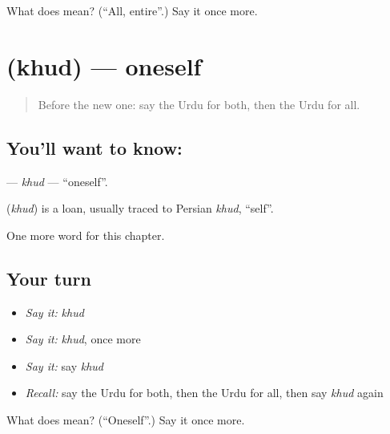 \begin{tcolorbox}[breakable,colback=teal!4,colframe=teal!35!black,title={Before you move on}]
What does  mean? (\textquotedblleft{}All, entire\textquotedblright{}.) Say it once more.
\end{tcolorbox}
\section[\texorpdfstring{\ur{خود} (khud)}{خود (khud)}]{ (khud) — oneself}

\label{lesson:UR-C90-khud}



\begin{quote}
Before the new one: say the Urdu for both, then the Urdu for all.
\end{quote}

\subsection*{You'll want to know: }
\textbf{} — \emph{khud} — \textquotedblleft{}oneself\textquotedblright{}.

\begin{cousinweb}
\textbf{} (\emph{khud}) is a loan, usually traced to Persian \emph{khud}, \textquotedblleft{}self\textquotedblright{}.
\end{cousinweb}

\begin{grammarlens}[title={What you've built}]
One more word for this chapter.
\end{grammarlens}

\subsection*{Your turn}
\begin{itemize}
\raggedright
  \item \emph{Say it:} \emph{khud}
  \item \emph{Say it:} \emph{khud}, once more
  \item \emph{Say it:} say \emph{khud}
  \item \emph{Recall:} say the Urdu for both, then the Urdu for all, then say \emph{khud} again
\end{itemize}

\begin{tcolorbox}[breakable,colback=teal!4,colframe=teal!35!black,title={Before you move on}]
What does  mean? (\textquotedblleft{}Oneself\textquotedblright{}.) Say it once more.
\end{tcolorbox}
